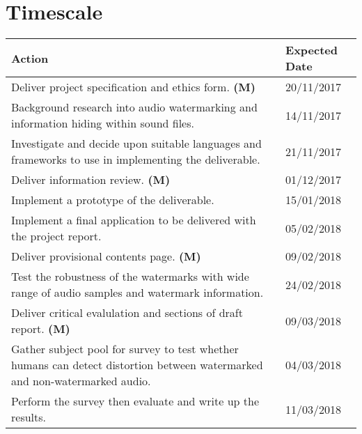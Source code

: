 \documentclass{article}
\begin{document}
	\section{Timescale}
	\begin{table}[htbp]
		\centering
		\label{timescale-table}
		\begin{tabularx}{\textwidth}{|X|l|}
			\hline
			\textbf{Action}                                                                                                             & \textbf{Expected Date} \\ \hline
			Deliver project specification and ethics form. \textbf{(M)}                                                                 & 20/11/2017             \\ \hline
			Background research into audio watermarking and information hiding within sound files.                                      & 14/11/2017             \\ \hline
			Investigate and decide upon suitable languages and frameworks to use in implementing the deliverable.                       & 21/11/2017             \\ \hline
			Deliver information review. \textbf{(M)}                                                                                    & 01/12/2017             \\ \hline
			Implement a prototype of the deliverable.                                                                                   & 15/01/2018             \\ \hline
			Implement a final application to be delivered with the project report.                                                      & 05/02/2018             \\ \hline
			Deliver provisional contents page. \textbf{(M)}                                                                             & 09/02/2018             \\ \hline
			Test the robustness of the watermarks with wide range of audio samples and watermark information.                           & 24/02/2018             \\ \hline
			Deliver critical evalulation and sections of draft report. \textbf{(M)}                                                     & 09/03/2018             \\ \hline
			Gather subject pool for survey to test whether humans can detect distortion between watermarked and non-watermarked audio.  & 04/03/2018             \\ \hline
			Perform the survey then evaluate and write up the results.                                                                  & 11/03/2018             \\ \hline

\end{tabularx}
\end{table}
\end{document}
